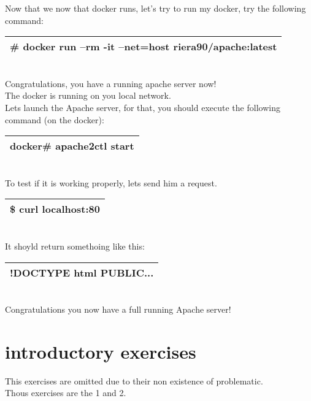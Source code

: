 \documentclass[a4paper,10pt]{article}
\begin{document}
Now that we now that docker runs, let's try to run my docker, try the following command:
\vspace{0.5cm}\\\begin{tabular}{|l|}\hline
\# docker run --rm -it --net=host riera90/apache:latest
\\\hline\end{tabular}\vspace{0.5cm}\\
Congratulations, you have a running apache server now!\\
The docker is running on you local network.\vspace{0.5cm}\\
Lets launch the Apache server, for that, you should execute the following command (on the docker):
\vspace{0.5cm}\\\begin{tabular}{|l|}\hline
docker\# apache2ctl start
\\\hline\end{tabular}\vspace{0.5cm}\\
To test if it is working properly, lets send him a request.
\vspace{0.5cm}\\\begin{tabular}{|l|}\hline
\$ curl localhost:80
\\\hline\end{tabular}\vspace{0.5cm}\\
It shoyld return somethoing like this:
\vspace{0.5cm}\\\begin{tabular}{|l|}\hline
!DOCTYPE html PUBLIC...
\\\hline\end{tabular}\vspace{0.5cm}\\
Congratulations you now have a full running Apache server!
\section{introductory exercises}
This exercises are omitted due to their non existence of problematic.\\
Thous exercises are the 1 and 2.
\end{document}
